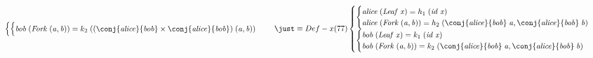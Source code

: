 \documentclass[a4paper]{article}
\newcommand{\Conid}[1]{\mathit{#1}}
\newcommand{\Varid}[1]{\mathit{#1}}
\begin{document}
\begin{eqnarray*}
\begin{cases}
\begin{cases}
        \ensuremath{\Varid{bob}\;(\Conid{Fork}\;(\Varid{a},\Varid{b}))\mathrel{=}k_2 \;((\conj{\Varid{alice}}{\Varid{bob}}\times\conj{\Varid{alice}}{\Varid{bob}})\;(\Varid{a},\Varid{b}))}
    \end{cases}
\end{cases}
%
\just\equiv{ Def-x (77)}
%
\begin{cases} 
    \begin{cases} 
        \ensuremath{\Varid{alice}\;(\Conid{Leaf}\;\Varid{x})\mathrel{=}h_1 \;(\Varid{id}\;\Varid{x})} \\
        \ensuremath{\Varid{alice}\;(\Conid{Fork}\;(\Varid{a},\Varid{b}))\mathrel{=}h_2 \;(\conj{\Varid{alice}}{\Varid{bob}}\;\Varid{a},\conj{\Varid{alice}}{\Varid{bob}}\;\Varid{b})}  
    \end{cases}\\
    \begin{cases} 
        \ensuremath{\Varid{bob}\;(\Conid{Leaf}\;\Varid{x})\mathrel{=}k_1 \;(\Varid{id}\;\Varid{x})}  \\
        \ensuremath{\Varid{bob}\;(\Conid{Fork}\;(\Varid{a},\Varid{b}))\mathrel{=}k_2 \;(\conj{\Varid{alice}}{\Varid{bob}}\;\Varid{a},\conj{\Varid{alice}}{\Varid{bob}}\;\Varid{b})}
    \end{cases}
\end{cases}

\end{eqnarray*}
\newpage
\end{document}
